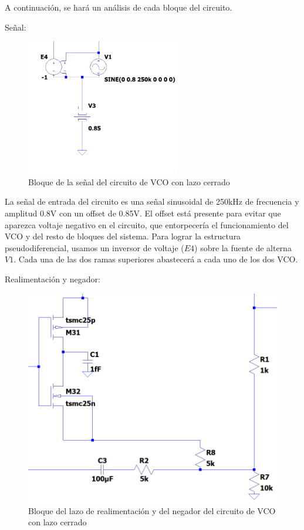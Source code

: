 \documentclass[12pt]{report} %
\begin{document}
	
	A continuación, se hará un análisis de cada bloque del circuito.
	
	Señal:
	
	\begin{figure}[H]
		\includegraphics[width=0.6\textwidth]{ltspice-vco-closed-signal-block.png}
		\caption[Bloque de la señal del circuito de VCO con lazo cerrado]{Bloque de la señal del circuito de VCO con lazo cerrado}
		\label{fig:ltspice-vco-closed-signal-block.png}
	\end{figure}

	La señal de entrada del circuito es una señal sinusoidal de 250kHz de frecuencia y amplitud 0.8V con un offset de 0.85V. El offset está presente para evitar que aparezca voltaje negativo en el circuito, que entorpecería el funcionamiento del VCO y del resto de bloques del sistema. Para lograr la estructura pseudodiferencial, usamos un inversor de voltaje ($E4$) sobre la fuente de alterna $V1$. Cada una de las dos ramas superiores abastecerá a cada uno de los dos VCO.
	
	Realimentación y negador:
	
	\begin{figure}[H]
		\includegraphics[width=\textwidth]{ltspice-vco-closed-loop-1.png}
		\caption[Bloque del lazo de realimentación y del negador del circuito de VCO con lazo cerrado]{Bloque del lazo de realimentación y del negador del circuito de VCO con lazo cerrado}
		\label{fig:ltspice-vco-closed-loop-1.png}
	\end{figure}
\end{document}
